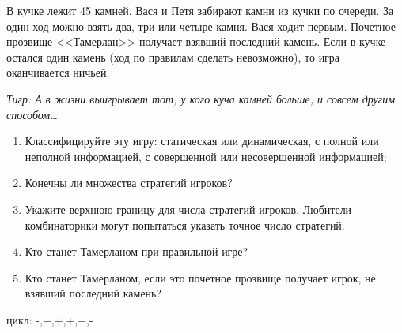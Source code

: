 \begin{problem}\par
В кучке лежит 45 камней. Вася и Петя забирают камни из кучки по очереди. За один ход можно взять два, три или четыре камня. Вася ходит первым. Почетное прозвище <<Тамерлан>> получает взявший последний камень. Если в кучке остался один камень (ход по правилам сделать невозможно), то игра оканчивается ничьей.\par
{\it Тигр: А в жизни выигрывает тот, у кого куча камней больше, и совсем другим способом\ldots }\par
\begin{enumerate}
\item	 Классифицируйте эту игру: статическая или динамическая, с полной или неполной информацией, с совершенной или несовершенной информацией;\par
\item	Конечны ли множества стратегий игроков?\par
\item	Укажите верхнюю границу для числа стратегий игроков. Любители комбинаторики могут попытаться указать точное число стратегий.\par
\item	Кто станет Тамерланом при правильной игре?\par
\item	Кто станет Тамерланом, если это почетное прозвище получает игрок, не взявший последний камень?
\end{enumerate}

\begin{sol}
 цикл: -,+,+,+,+,-
\end{sol}
\end{problem}




